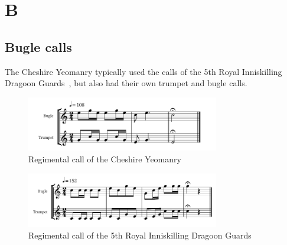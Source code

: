 \chapter*{B}

\section*{Bugle calls}

The Cheshire Yeomanry typically used the calls of the 5th Royal Inniskilling Dragoon Guards~\cite[p11]{trumpet-and-bugle-calls}, but also had their own trumpet and bugle calls.

\begin{figure}[h]
  \centering
  \includegraphics[width=0.75\textwidth]{gazette/cheshire-yeomanry-call.pdf}
  \caption*{Regimental call of the Cheshire Yeomanry~\cite[p11]{trumpet-and-bugle-calls}}
\end{figure}

\begin{figure}[h]
  \centering
  \includegraphics[width=0.75\textwidth]{gazette/5ridg-call.pdf}
  \caption*{Regimental call of the 5th Royal Inniskilling Dragoon Guards~\cite[p3]{trumpet-and-bugle-calls}}
\end{figure}
